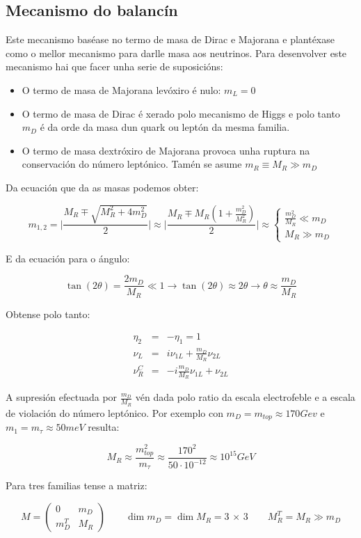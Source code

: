 \documentclass[a4paper,10pt]{article}
\newcommand{\beq}{\begin{equation}}
\newcommand{\eeq}{\end{equation}}
\newcommand{\bea}{\begin{eqnarray}}
\newcommand{\eea}{\end{eqnarray}}
\newcommand{\bi}{\begin{itemize}}
\newcommand{\ei}{\end{itemize}}
\newcommand{\bc}{\begin{cases}}
\newcommand{\ec}{\end{cases}}
\newcommand{\bmx}{\left(\begin{array}}
\newcommand{\emx}{\end{array}\right)}
\begin{document}
\subsection{Mecanismo do balancín}

Este mecanismo baséase no termo de masa de Dirac e Majorana e plantéxase como o mellor mecanismo para darlle masa aos neutrinos. Para desenvolver este mecanismo hai que facer unha serie de suposicións:

\bi

\item O termo de masa de Majorana levóxiro é nulo: $m_L = 0$

\item O termo de masa de Dirac é xerado polo mecanismo de Higgs e polo tanto $m_D$ é da orde da masa dun quark ou leptón da mesma familia.

\item O termo de masa dextróxiro de Majorana provoca unha ruptura na conservación do número leptónico. Tamén se asume $m_R \equiv M_R \gg m_D$

\ei

Da ecuación que da as masas podemos obter:

\beq
m_{1,2} = \Bigg| \frac{M_R \mp \sqrt{M_R^2 + 4 m_D^2}}{2} \Bigg| \approx \Bigg| \frac{M_R \mp M_R \left( 1 + \frac{ m_D^2}{M_R^2}\right)}{2} \Bigg|  \approx
\bc
\frac{m_D^2}{M_R} \ll m_D \\
M_R \gg m_D
\ec
\eeq

E da ecuación para o ángulo:

\beq
\tan (2\theta) = \frac{2 m_D}{M_R} \ll 1 \rightarrow \tan (2\theta) \approx 2\theta \rightarrow \theta \approx \frac{m_D}{M_R}
\eeq

Obtense polo tanto:

\bea
\eta_2 &=& - \eta_1 = 1 \\
\nu_L &=& i \nu_{1L} + \frac{m_D}{M_R} \nu_{2L} \\
\nu_R^C &=& - i \frac{m_D}{M_R} \nu_{1L} + \nu_{2L}
\eea

A supresión efectuada por $\frac{m_D}{M_R}$ vén dada polo ratio da escala electrofeble e a escala de violación do número leptónico. Por exemplo con $m_D = m_{top} \approx 170 Gev $ e $m_1 = m_\tau \approx 50 meV $ resulta:

\beq
M_R \approx \frac{m_{top}^2}{m_\tau} \approx \frac{170^2}{50 \cdot 10^{-12}} \approx 10^{15} GeV
\eeq

Para tres familias tense a matriz:

\beq
M = \bmx{cc} 0 & m_D \\ m_D^T & M_R \emx \qquad \dim m_D = \dim M_R = 3 \, \times \, 3 \qquad M_R^T = M_R \gg m_D
\eeq
\end{document}
